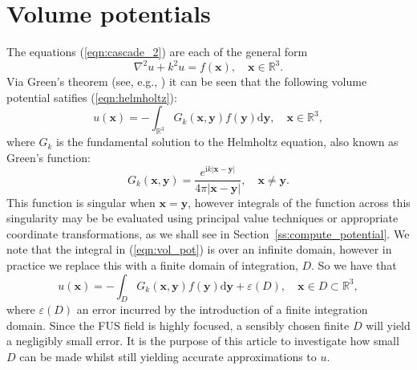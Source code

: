 \documentclass[11pt]{article}
\numberwithin{equation}{section}
\newcommand{\sd}{\mbox{d}}
\newcommand{\bx}{\mathbf{x}}
\newcommand{\by}{\mathbf{y}}
\newcommand{\red}[1]{{\color{black} #1}}
\begin{document}
\section{Volume potentials}
\label{sec:volume}
The equations (\ref{eqn:cascade_2}) are each of the general form
\begin{equation}
    \nabla^2 u + k^2 u = f(\bx), \quad \bx\in\mathbb{R}^3.
    \label{eqn:helmholtz}
\end{equation}
Via Green's theorem (see, e.g., \cite{colton2013integral,costabel2015spectrum})
it can be seen that the following volume potential satifies (\ref{eqn:helmholtz}):
\begin{equation}
    u(\bx) = -\int_{\mathbb{R}^3}G_k(\bx,\by)f(\by)\sd \by, \quad \bx\in\mathbb{R}^3,
    \label{eqn:vol_pot}
\end{equation}
where $G_k$ is the fundamental solution to the Helmholtz equation, also known as 
Green's function:
\begin{equation}
    G_k(\bx,\by)=\frac{e^{\text{i} k|\bx-\by|}}{4\pi|\bx-\by|},\quad \bx\neq\by.
    \label{eqn:green}
\end{equation}
\red{This function is singular when $\bx=\by$, however integrals of the function
across this singularity may be be evaluated using principal value techniques or 
appropriate coordinate transformations, as we shall see in Section~\ref{ss:compute_potential}.}
We note that the integral in (\ref{eqn:vol_pot}) is over an infinite domain, 
however in practice we replace this with a finite domain of integration, $D$.
So we have that 
\begin{equation}
    u(\bx) = -\int_{D}G_k(\bx,\by)f(\by)\sd \by + \varepsilon(D), \quad \bx\in D\subset\mathbb{R}^3,
    \label{eqn:vol_pot_approx}
\end{equation}
where $\varepsilon(D)$ an error incurred by the introduction of a finite integration
domain. Since the \red{FUS} field is highly focused, a sensibly chosen finite $D$ will 
yield a negligibly small error. It is the purpose of this article to investigate how small $D$ 
can be made whilst still yielding accurate approximations to $u$.
\end{document}
